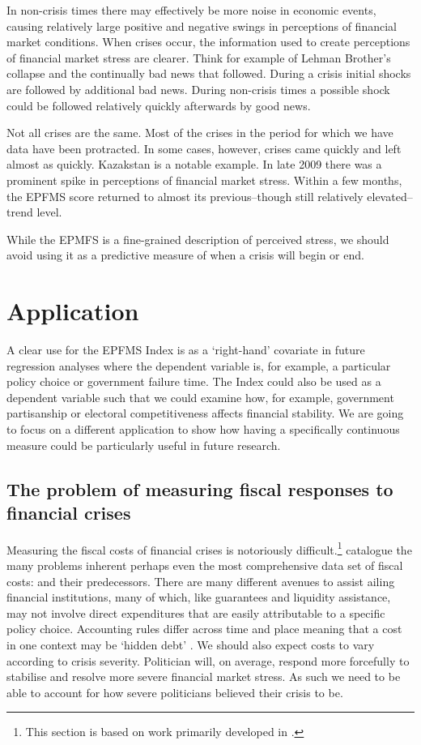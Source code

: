 \documentclass[]{article}
\begin{document}
In non-crisis times there may effectively be more noise in economic events, causing relatively large positive and negative swings in perceptions of financial market conditions. When crises occur, the information used to create perceptions of financial market stress are clearer. Think for example of Lehman Brother's collapse and the continually bad news that followed. During a crisis initial shocks are followed by additional bad news. During non-crisis times a possible shock could be followed relatively quickly afterwards by good news.

Not all crises are the same. Most of the crises in the period for which we have data have been protracted. In some cases, however, crises came quickly and left almost as quickly. Kazakstan is a notable example. In late 2009 there was a prominent spike in perceptions of financial market stress. Within a few months, the EPFMS score returned to almost its previous--though still relatively elevated--trend level.

While the EPMFS is a fine-grained description of perceived stress, we should avoid using it as a predictive measure of when a crisis will begin or end.

\section{Application}\label{application}

A clear use for the EPFMS Index is as a `right-hand' covariate in future regression analyses where the dependent variable is, for example, a particular policy choice or government failure time. The Index could also be used as a dependent variable such that we could examine how, for example, government partisanship or electoral competitiveness affects financial stability. We are going to focus on a different application to show how having a specifically continuous measure could be particularly useful in future research.

\subsection{The problem of measuring fiscal responses to financial crises}

Measuring the fiscal costs of financial crises is notoriously difficult.\footnote{This section is based on work primarily developed in \cite{gandrudHallerbergPBC}.} \cite{GandrudHallerberg2015} catalogue the many problems inherent perhaps even the most comprehensive data set of fiscal costs: \cite{laeven2013} and their predecessors. There are many different avenues to assist ailing financial institutions, many of which, like guarantees and liquidity assistance, may not involve direct expenditures that are easily attributable to a specific policy choice. Accounting rules differ across time and place \citep{gandrudHallerbergWEP} meaning that a cost in one context may be `hidden debt' \citep{reinhartRogoff2011}. We should also expect costs to vary according to crisis severity. Politician will, on average, respond more forcefully to stabilise and resolve more severe financial market stress. As such we need to be able to account for how severe politicians believed their crisis to be.
\end{document}
